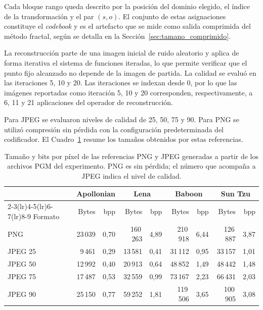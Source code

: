 \documentclass[a4paper]{llncs}
\begin{document}
Cada bloque rango queda descrito por la posición del dominio elegido, el índice de la transformación y el par $(s, o)$. El conjunto de estas asignaciones constituye el \emph{codebook} y es el artefacto que se mide como salida comprimida del método fractal, según se detalla en la Sección~\ref{sec:tamano_comprimido}.

La reconstrucción parte de una imagen inicial de ruido aleatorio y aplica de forma iterativa el sistema de funciones iteradas, lo que permite verificar que el punto fijo alcanzado no depende de la imagen de partida. La calidad se evaluó en las iteraciones 5, 10 y 20. Las iteraciones se indexan desde 0, por lo que las imágenes reportadas como iteración 5, 10 y 20 corresponden, respectivamente, a 6, 11 y 21 aplicaciones del operador de reconstrucción.

Para JPEG se evaluaron niveles de calidad de 25, 50, 75 y 90. Para PNG se utilizó compresión sin pérdida con la configuración predeterminada del codificador. El Cuadro~\ref{tab:referencias} resume los tamaños obtenidos por estas referencias.

\begin{table}[htbp]
\centering
\caption{Tamaño y bits por píxel de las referencias PNG y JPEG generadas a partir de los archivos PGM del experimento. PNG es sin pérdida; el número que acompaña a JPEG indica el nivel de calidad.}
\label{tab:referencias}
\scriptsize
\setlength{\tabcolsep}{2.5pt}
\begin{tabular}{lrrrrrrrr}
\toprule
& \multicolumn{2}{c}{Apollonian} & \multicolumn{2}{c}{Lena} & \multicolumn{2}{c}{Baboon} & \multicolumn{2}{c}{Sun Tzu} \\
\cmidrule(lr){2-3}\cmidrule(lr){4-5}\cmidrule(lr){6-7}\cmidrule(lr){8-9}
Formato & Bytes & bpp & Bytes & bpp & Bytes & bpp & Bytes & bpp \\
\midrule
PNG     & 23\,039 & 0,70 & 160\,263 & 4,89 & 210\,918 & 6,44 & 126\,887 & 3,87 \\
JPEG 25 &  9\,461 & 0,29 &  13\,581 & 0,41 &  31\,112 & 0,95 &  33\,157 & 1,01 \\
JPEG 50 & 12\,992 & 0,40 &  20\,913 & 0,64 &  48\,852 & 1,49 &  48\,442 & 1,48 \\
JPEG 75 & 17\,487 & 0,53 &  32\,559 & 0,99 &  73\,167 & 2,23 &  66\,431 & 2,03 \\
JPEG 90 & 25\,150 & 0,77 &  59\,252 & 1,81 & 119\,506 & 3,65 & 100\,905 & 3,08 \\
\bottomrule
\end{tabular}
\end{table}
\end{document}
